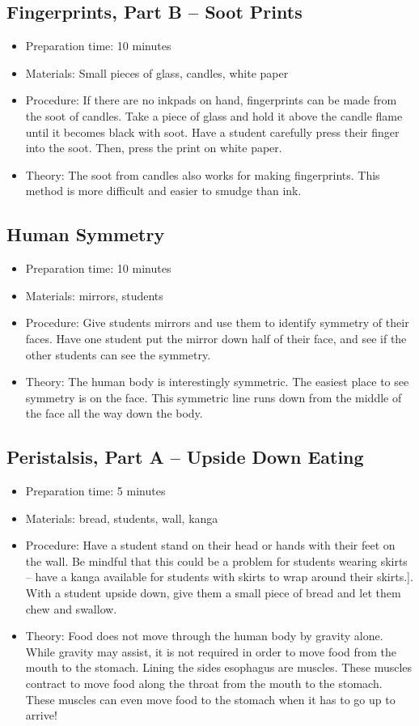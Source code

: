 \subsection{Fingerprints, Part B -- Soot Prints}
\begin{itemize}
\item{Preparation time: 10 minutes}
\item{Materials: Small pieces of glass, candles, white paper}
\item{Procedure: If there are no inkpads on hand, fingerprints can be made from the soot of candles. Take a piece of glass and hold it above the candle flame until it becomes black with soot. Have a student carefully press their finger into the soot. Then, press the print on white paper.}
\item{Theory: The soot from candles also works for making fingerprints. This method is more difficult and easier to smudge than ink.}
\end{itemize}

\subsection{Human Symmetry}
\begin{itemize}
\item{Preparation time: 10 minutes}
\item{Materials: mirrors, students}
\item{Procedure: Give students mirrors and use them to identify symmetry of their faces. Have one student put the mirror down half of their face, and see if the other students can see the symmetry.}
\item{Theory: The human body is interestingly symmetric. The easiest place to see symmetry is on the face. This symmetric line runs down from the middle of the face all the way down the body.}
\end{itemize}

\subsection{Peristalsis, Part A -- Upside Down Eating}
\begin{itemize}
\item{Preparation time: 5 minutes}
\item{Materials: bread, students, wall, kanga}
\item{Procedure: Have a student stand on their head or hands with their feet on the wall. Be mindful that this could be a problem for students wearing skirts -- have a kanga available for students with skirts to wrap around their skirts.]. With a student upside down, give them a small piece of bread and let them chew and swallow.}
\item{Theory: Food does not move through the human body by gravity alone. While gravity may assist, it is not required in order to move food from the mouth to the stomach. Lining the sides esophagus are muscles. These muscles contract to move food along the throat from the mouth to the stomach. These muscles can even move food to the stomach when it has to go up to arrive!}
\end{itemize}

